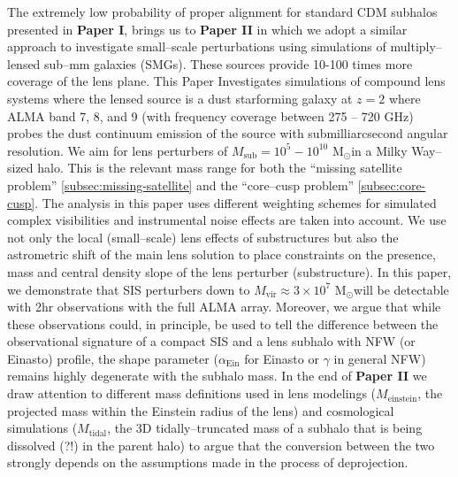 \documentclass[a4wide,12pt]{book}
\newcommand{\msun }{$\mathrm{M}_{\odot}$}
\begin{document}
{The extremely low probability of proper alignment for standard CDM subhalos presented in {\bf Paper I}, brings us to {\bf Paper II} in which we adopt a similar approach to investigate small--scale perturbations using simulations of multiply--lensed sub--mm galaxies (SMGs).  These sources provide 10-100 times more coverage of the lens plane. This Paper Investigates simulations of compound lens systems where the lensed source is a dust starforming galaxy at $z = 2$ where ALMA band 7, 8, and 9 (with frequency coverage between 275 -- 720 GHz) probes the dust continuum emission of the source with submilliarcsecond angular resolution.  We aim for lens perturbers of $M_\mathrm{sub} = 10^5 - 10^{10} $ \msun  in a Milky Way--sized halo.  This is the relevant mass range for both the ``missing satellite problem'' \ref{subsec:missing-satellite} and the ``core--cusp problem'' \ref{subsec:core-cusp}. The analysis in this paper uses different weighting schemes for simulated complex visibilities and instrumental noise effects are taken into account. We use not only the local (small--scale) lens effects of substructures but also the astrometric shift of the main lens solution to place constraints on the presence, mass and central density slope of the lens perturber (substructure). In this paper, we demonstrate that SIS perturbers down to $M_\mathrm{vir} \approx 3\times 10^7 $ \msun  will be detectable with 2hr observations with the full ALMA array. Moreover, we argue that while these observations could, in principle, be used to tell the difference between the observational signature of a compact SIS and a lens subhalo with NFW (or Einasto) profile, the shape parameter ($\alpha_\mathrm{Ein}$ for Einasto or $\gamma$ in general NFW) remains highly degenerate with the subhalo mass. In the end of {\bf Paper II} we draw attention to different mass definitions used in lens modelings ($M_\mathrm{einstein}$, the projected mass within the Einstein radius of the lens) and cosmological simulations ($M_\mathrm{tidal}$, the 3D tidally--truncated mass of a subhalo that is being dissolved (?!) in the parent halo) to argue that the conversion between the two strongly depends on the assumptions made in the process of deprojection. 



 

}
\end{document}
